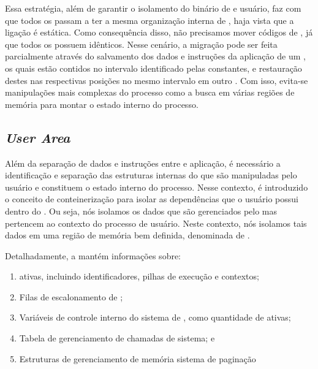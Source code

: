     Essa estratégia, além de garantir o isolamento do binário de  e usuário, faz com que todos os \clusters passam a ter a mesma organização interna de , haja vista que a ligação é estática. Como consequência disso, não precisamos mover códigos de , já que todos os \clusters possuem  idênticos. Nesse cenário, a migração pode ser feita parcialmente através do salvamento dos dados e instruções da aplicação de um \cluster, os quais estão contidos no intervalo identificado pelas constantes, e restauração destes nas respectivas posições \ie no mesmo intervalo em outro \cluster. Com isso, evita-se manipulações mais complexas do processo como a busca em várias regiões de memória para montar o estado interno do processo.

    
\subsection{\textit{User Area}}
\label{sec.uarea}

    Além da separação de dados e instruções entre  e aplicação, é necessário a identificação e separação das estruturas internas do \so que são manipuladas pelo usuário e constituem o estado interno do processo. Nesse contexto, é introduzido o conceito de conteinerização para isolar as dependências que o usuário possui dentro do \cluster. Ou seja, nós isolamos os dados que são gerenciados pelo  mas pertencem ao contexto do processo de usuário. Neste contexto, nós isolamos tais dados em uma região de memória bem definida, denominada de \uarea. 

    Detalhadamente, a \uarea mantém informações sobre:
    \begin{enumerate}[label=(\roman*)]
        \item \Threads ativas, incluindo identificadores, pilhas de execução e contextos;
        \item Filas de escalonamento de \threads;
        \item Variáveis de controle interno do sistema de \threads, como quantidade de \threads ativas;
        \item Tabela de gerenciamento de chamadas de sistema; e
        \item Estruturas de gerenciamento de memória \eg sistema de paginação
    \end{enumerate}

